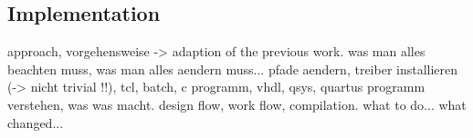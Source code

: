 \subsection{Implementation}
approach, vorgehensweise -> adaption of the previous work. 
was man alles beachten muss, was man alles aendern muss...
pfade aendern, treiber installieren (-> nicht trivial !!), tcl, batch, c programm, vhdl, qsys, quartus programm verstehen, was was macht. design flow, work flow, compilation.
what to do... what changed... 

